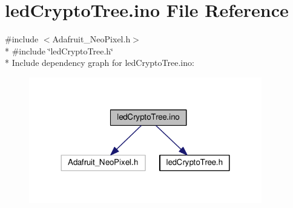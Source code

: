 \hypertarget{ledCryptoTree_8ino}{\section{led\+Crypto\+Tree.\+ino File Reference}
\label{ledCryptoTree_8ino}
}
{\ttfamily \#include $<$Adafruit\+\_\+\+Neo\+Pixel.\+h$>$}\\*
{\ttfamily \#include \char`\"{}led\+Crypto\+Tree.\+h\char`\"{}}\\*
Include dependency graph for led\+Crypto\+Tree.\+ino\+:
\nopagebreak
\begin{figure}[H]
\begin{center}
\leavevmode
\includegraphics[width=288pt]{ledCryptoTree_8ino__incl}
\end{center}
\end{figure}
